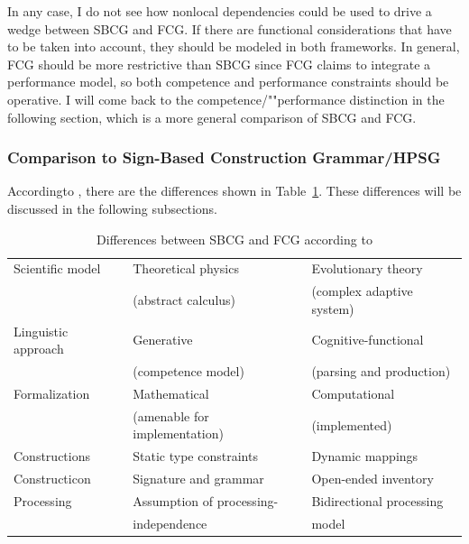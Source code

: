 In any case, I do not see how nonlocal dependencies could be used to drive a wedge between SBCG and
FCG. If there are functional considerations that have to be taken into account, they should be
modeled in both frameworks. In general, FCG should be more restrictive than SBCG since FCG claims to
integrate a performance model, so both competence and performance constraints should be operative. I
will come back to the competence/""performance distinction in the following section, which is a more
general comparison of SBCG and FCG.

\subsubsection{Comparison to Sign-Based Construction Grammar/HPSG}


According\indexhpsgstart\indexsbcgstart to \citet{vanTrijp2013a}, there are the differences shown in Table~\ref{table-differences-SBCG-FCG}.
%
These differences will be discussed in the following subsections.
\begin{table}
\caption{\label{table-differences-SBCG-FCG}Differences between SBCG and FCG according to \citet[]{vanTrijp2013a}}
\begin{tabular}{@{}lll@{}}\hline\hline
Scientific model    & Theoretical physics           & Evolutionary theory\\
                    & (abstract calculus)           &  (complex adaptive system)\\
Linguistic approach & Generative                    & Cognitive-functional\\
                    & (competence model)            & (parsing and production)\\
Formalization       & Mathematical                  & Computational\\ 
                    & (amenable for implementation) & (implemented)\\
Constructions       & Static type constraints       & Dynamic mappings\\
Constructicon       & Signature and grammar         & Open-ended inventory\\
Processing          & Assumption of processing-     & Bidirectional processing\\
                    & independence                  & model\\\hline\hline
\end{tabular}
\end{table}%

